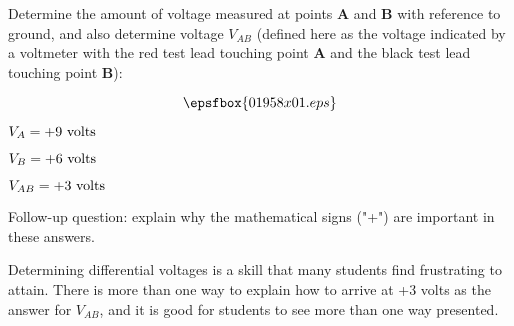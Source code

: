 

Determine the amount of voltage measured at points {\bf A} and {\bf B} with reference to ground, and also determine voltage $V_{AB}$ (defined here as the voltage indicated by a voltmeter with the red test lead touching point {\bf A} and the black test lead touching point {\bf B}):

$$\epsfbox{01958x01.eps}$$







$V_A = +9 \hbox{ volts}$

$V_B = +6 \hbox{ volts}$

$V_{AB} = +3 \hbox{ volts}$

\vskip 10pt

Follow-up question: explain why the mathematical signs ("+") are important in these answers.







Determining differential voltages is a skill that many students find frustrating to attain.  There is more than one way to explain how to arrive at +3 volts as the answer for $V_{AB}$, and it is good for students to see more than one way presented.




